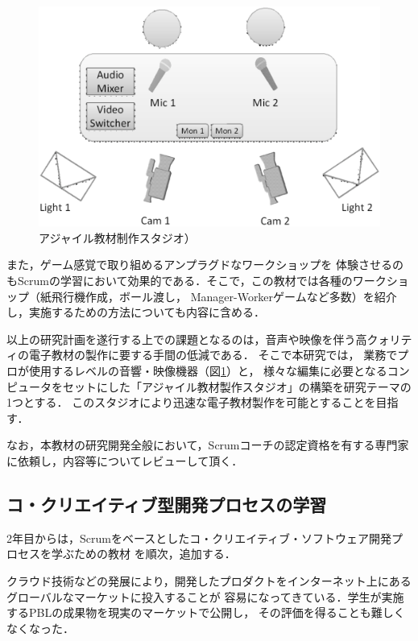 \documentclass[a4j,9pt,twoside,twocolumn]{jsarticle}
\begin{document}
\begin{figure}
\begin{center}
\includegraphics[width=\linewidth]{figs/studio.eps}
\caption{アジャイル教材制作スタジオ）}
\label{fig:studio}
\end{center}
\end{figure}

	また，ゲーム感覚で取り組めるアンプラグドなワークショップを
	体験させるのもScrumの学習において効果的である．そこで，この教材では各種のワークショップ（紙飛行機作成，ボール渡し，
	Manager-Workerゲームなど多数）を紹介し，実施するための方法についても内容に含める．

	以上の研究計画を遂行する上での課題となるのは，音声や映像を伴う高クォリティの電子教材の製作に要する手間の低減である．
	そこで本研究では，
	業務でプロが使用するレベルの音響・映像機器（図\ref{fig:studio}）と，
	様々な編集に必要となるコンピュータをセットにした「アジャイル教材製作スタジオ」の構築を研究テーマの1つとする．
	このスタジオにより迅速な電子教材製作を可能とすることを目指す．

	なお，本教材の研究開発全般において，Scrumコーチの認定資格を有する専門家に依頼し，内容等についてレビューして頂く．

\subsection{コ・クリエイティブ型開発プロセスの学習}
	
	2年目からは，Scrumをベースとしたコ・クリエイティブ・ソフトウェア開発プロセスを学ぶための教材
	を順次，追加する．

	クラウド技術などの発展により，開発したプロダクトをインターネット上にあるグローバルなマーケットに投入することが
	容易になってきている．学生が実施するPBLの成果物を現実のマーケットで公開し，
	その評価を得ることも難しくなくなった．
	
\end{document}
